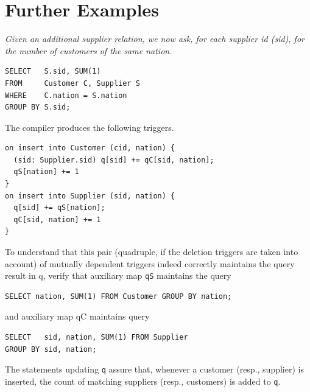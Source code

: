 

\appendix


\section{Further Examples}


\begin{example}\em
\label{ex:nation}
Given an additional supplier relation, we now ask, for each supplier id (sid),
for the number of customers of the same nation.
\begin{verbatim}
SELECT   S.sid, SUM(1)
FROM     Customer C, Supplier S
WHERE    C.nation = S.nation
GROUP BY S.sid;
\end{verbatim}
The compiler produces the following triggers.
\begin{verbatim}
on insert into Customer (cid, nation) {
  (sid: Supplier.sid) q[sid] += qC[sid, nation];
  qS[nation] += 1
}
on insert into Supplier (sid, nation) {
  q[sid] += qS[nation];
  qC[sid, nation] += 1
}
\end{verbatim}
To understand that this pair
(quadruple, if the deletion triggers are taken into account) of
mutually dependent triggers indeed correctly maintains the query result in q,
verify that auxiliary map {\tt qS} maintains the query
\begin{verbatim}
SELECT nation, SUM(1) FROM Customer GROUP BY nation;
\end{verbatim}
and auxiliary map qC maintains query
\begin{verbatim}
SELECT   sid, nation, SUM(1) FROM Supplier
GROUP BY sid, nation;
\end{verbatim}
The statements updating {\tt q} assure that,
whenever a customer (resp., supplier) is inserted, the count of
matching suppliers (resp., customers) is added to {\tt q}.
\punto
\end{example}


